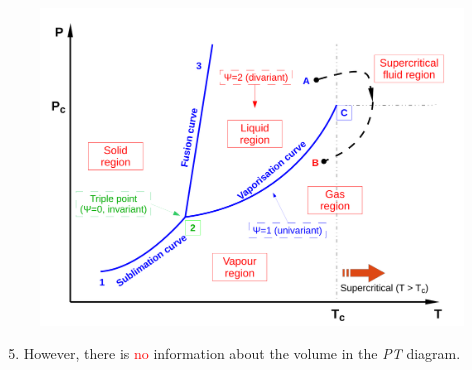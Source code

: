 \documentclass[10pt,compress]{beamer}
\newcommand{\red}{\textcolor{red}}
\begin{document}
\begin{frame}
\begin{columns}
\begin{column}[l]{0.5\linewidth}
\begin{figure}
\begin{center}
          \includegraphics[width=1.05\columnwidth,clip]{./../Pics/PT_Diagram}
        \end{center}
      \end{figure}
     \begin{enumerate}\setcounter{enumi}{4}\scriptsize
        \item<5-> However, there is \red{no} information about the volume in the {\it PT} diagram.
     \end{enumerate}
  \end{column}
 \end{columns}
\end{frame}
 
\end{document}
